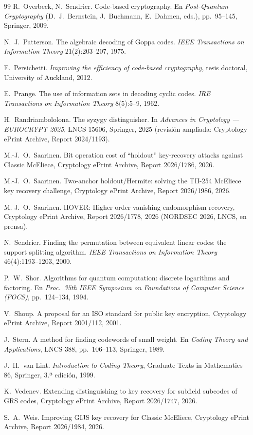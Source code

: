\documentclass[11pt,a4paper,oneside]{report}
\begin{document}
\begin{thebibliography}{99}
R.~Overbeck, N.~Sendrier. Code-based cryptography. En
\emph{Post-Quantum Cryptography} (D.~J.~Bernstein, J.~Buchmann,
E.~Dahmen, eds.), pp.~95--145, Springer, 2009.

N.~J.~Patterson. The algebraic decoding of Goppa codes. \emph{IEEE
Transactions on Information Theory} 21(2):203--207, 1975.

E.~Persichetti. \emph{Improving the efficiency of code-based
cryptography}, tesis doctoral, University of Auckland, 2012.

E.~Prange. The use of information sets in decoding cyclic codes.
\emph{IRE Transactions on Information Theory} 8(5):5--9, 1962.

H.~Randriambololona. The syzygy distinguisher. In \emph{Advances in
Cryptology --- EUROCRYPT 2025}, LNCS 15606, Springer, 2025
(revisi\'on ampliada: Cryptology ePrint Archive, Report 2024/1193).

M.-J.~O.~Saarinen. Bit operation cost of ``holdout'' key-recovery
attacks against Classic McEliece, Cryptology ePrint Archive,
Report 2026/1786, 2026.

M.-J.~O.~Saarinen. Two-anchor holdout/Hermite: solving the TII-254
McEliece key recovery challenge, Cryptology ePrint Archive,
Report 2026/1986, 2026.

M.-J.~O.~Saarinen. HOVER: Higher-order vanishing endomorphism
recovery, Cryptology ePrint Archive, Report 2026/1778, 2026
(NORDSEC 2026, LNCS, en prensa).

N.~Sendrier. Finding the permutation between equivalent linear
codes: the support splitting algorithm. \emph{IEEE Transactions on
Information Theory} 46(4):1193--1203, 2000.

P.~W.~Shor. Algorithms for quantum computation: discrete logarithms
and factoring. En \emph{Proc.\ 35th IEEE Symposium on Foundations of
Computer Science (FOCS)}, pp.~124--134, 1994.

V.~Shoup. A proposal for an ISO standard for public key encryption,
Cryptology ePrint Archive, Report 2001/112, 2001.

J.~Stern. A method for finding codewords of small weight. En
\emph{Coding Theory and Applications}, LNCS 388, pp.~106--113,
Springer, 1989.

J.~H.~van Lint. \emph{Introduction to Coding Theory}, Graduate
Texts in Mathematics 86, Springer, 3.ª edici\'on, 1999.

K.~Vedenev. Extending distinguishing to key recovery for subfield
subcodes of GRS codes, Cryptology ePrint Archive, Report 2026/1747,
2026.

S.~A.~Weis. Improving GIJS key recovery for Classic McEliece,
Cryptology ePrint Archive, Report 2026/1984, 2026.

\end{thebibliography}

\clearpage
\end{document}
